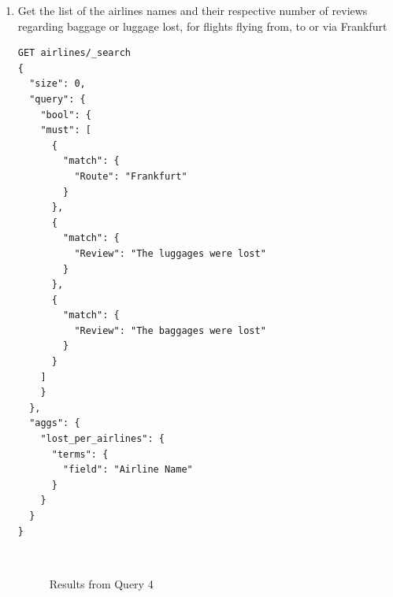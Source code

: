 \documentclass{Configuration_Files/PoliMi3i_thesis}
\begin{document}
\begin{enumerate}
    \item Get the list of the airlines names and their respective number of reviews regarding baggage or luggage lost, for flights flying from, to or via Frankfurt

\begin{verbatim}
GET airlines/_search
{
  "size": 0,
  "query": {
    "bool": {
    "must": [
      {
        "match": {
          "Route": "Frankfurt"
        }
      },
      {
        "match": {
          "Review": "The luggages were lost"
        }
      },
      {
        "match": {
          "Review": "The baggages were lost"
        }
      }
    ]
    }
  },
  "aggs": {
    "lost_per_airlines": {
      "terms": {
        "field": "Airline Name"
      }
    }
  }
}
\end{verbatim}
\newpage
\begin{figure}[H]
    \centering
    \\
    \caption{Results from Query 4}


\end{figure}
\end{enumerate}
\end{document}

